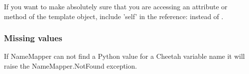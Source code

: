 If you want to make absolutely sure that you are accessing an attribute or
method of the template object, include 'self' in the reference:
 instead of .

\subsubsection{Missing values}
\label{language.namemapper.missing}

If NameMapper can not find a Python value for a Cheetah variable name it will
raise the NameMapper.NotFound exception.

